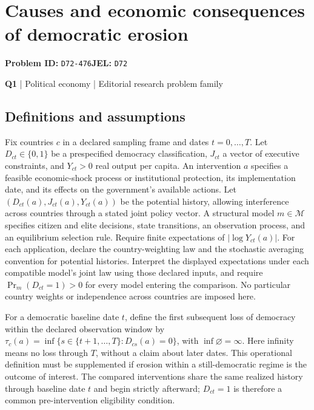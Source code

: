 \documentclass[11pt,a4paper]{article}
\begin{document}
\section*{Causes and economic consequences of democratic erosion}
\textbf{Problem ID:} \texttt{D72-476}\quad \textbf{JEL:} \texttt{D72}\par
\label{problem:OP-0121}
\label{atlas:prob:Q1}
{\sffamily\small\color{muted}\textbf{Q1} | Political economy | Editorial research problem family\par}
\subsection*{Definitions and assumptions}
Fix countries $c$ in a declared sampling frame and dates $t=0,\ldots,T$. Let $D_{ct}\in\{0,1\}$ be a prespecified democracy classification, $J_{ct}$ a vector of executive constraints, and $Y_{ct}>0$ real output per capita. An intervention $a$ specifies a feasible economic-shock process or institutional protection, its implementation date, and its effects on the government's available actions. Let $(D_{ct}(a),J_{ct}(a),Y_{ct}(a))$ be the potential history, allowing interference across countries through a stated joint policy vector. A structural model $m\in\mathcal M$ specifies citizen and elite decisions, state transitions, an observation process, and an equilibrium selection rule. Require finite expectations of $|\log Y_{ct}(a)|$. For each application, declare the country-weighting law and the stochastic averaging convention for potential histories. Interpret the displayed expectations under each compatible model's joint law using those declared inputs, and require $\Pr_m(D_{ct}=1)>0$ for every model entering the comparison. No particular country weights or independence across countries are imposed here.

For a democratic baseline date $t$, define the first subsequent loss of democracy within the declared observation window by $\tau_c(a)=\inf\{s\in\{t+1,\ldots,T\}:D_{cs}(a)=0\}$, with $\inf\varnothing=\infty$. Here infinity means no loss through $T$, without a claim about later dates. This operational definition must be supplemented if erosion within a still-democratic regime is the outcome of interest. The compared interventions share the same realized history through baseline date $t$ and begin strictly afterward; $D_{ct}=1$ is therefore a common pre-intervention eligibility condition.
\end{document}
